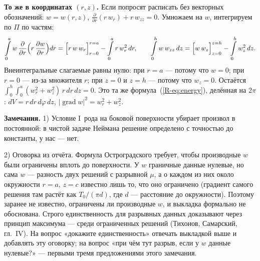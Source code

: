 \documentclass[a4paper,12pt]{article}
\newcommand{\rf}[1]{(\ref*{R-#1})}
\newcommand{\pd}[2]{\dfrac{\partial #1}{\partial #2}}
\DeclareMathOperator{\Grad}{grad}
\begin{document}
\textbf{То же в координатах $(r,z)$.} Если попросят расписать без векторных
обозначений: $w=w(r,z)$,
$\frac{\partial}{\partial r}(r\,w_r)+r\,w_{zz}=0$. Умножаем на $w$,
интегрируем по $\Pi$ по частям:
\[
\int\limits_0^a w\,\pd{}{r}\Bigl(r\,\pd{w}{r}\Bigr)dr
=\Bigl[r\,w\,w_r\Bigr]_{r=0}^{r=a}-\int\limits_0^a r\,w_r^2\,dr,
\qquad
\int\limits_0^h w\,w_{zz}\,dz=\Bigl[w\,w_z\Bigr]_{z=0}^{z=h}-\int\limits_0^h w_z^2\,dz .
\]
Внеинтегральные слагаемые равны нулю: при $r=a$ — потому что $w=0$; при
$r=0$ — из-за множителя $r$; при $z=0$ и $z=h$ — потому что $w_z=0$.
Остаётся $\int_0^h\!\int_0^a(w_r^2+w_z^2)\,r\,dr\,dz=0$. Это та же
формула~\rf{eq:energy}, делённая на $2\pi$: $dV=r\,dr\,d\varphi\,dz$,
$|\Grad w|^2=w_r^2+w_z^2$.

\textbf{Замечания.} 1) Условие I~рода на боковой поверхности убирает
произвол в постоянной: в чистой задаче Неймана решение определено с
точностью до константы, у нас — нет.

2) Оговорка из отчёта. Формула Остроградского требует, чтобы производные
$w$ были ограничены вплоть до поверхности. У $w$ граничные данные нулевые,
но сама $w$ — разность двух решений с разрывной $\mu$, а о каждом из них
около окружности $r=a$, $z=c$ известно лишь то, что оно ограничено
(градиент самого решения там растёт как $T_0/(\pi d)$, где $d$ — расстояние
до окружности). Поэтому заранее не известно, ограничены ли производные $w$,
и выкладка формально не обоснована. Строго единственность для разрывных
данных доказывают через принцип максимума — среди ограниченных решений
(Тихонов, Самарский, гл.~IV). На вопрос «докажите единственность» отвечать
выкладкой выше и добавлять эту оговорку; на вопрос «при чём тут разрыв,
если у $w$ данные нулевые?» — первыми тремя предложениями этого замечания.
\end{document}
